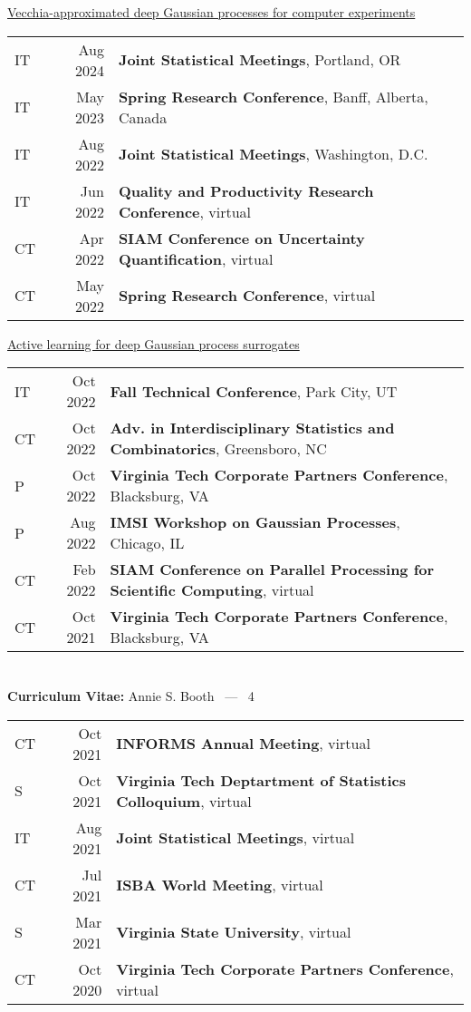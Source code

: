 \documentclass[margin,line,11pt]{res}
\begin{document}
\begin{resume}
\underline{Vecchia-approximated deep Gaussian processes for computer experiments}\\
\begin{tabular}{lrl}
IT & Aug 2024 & {\bf Joint Statistical Meetings}, Portland, OR \\
IT & May 2023 & {\bf Spring Research Conference}, Banff, Alberta, Canada \\
IT & Aug 2022 & {\bf Joint Statistical Meetings}, Washington, D.C. \\
IT & Jun 2022 & {\bf Quality and Productivity Research Conference}, virtual \\
CT & Apr 2022 & {\bf SIAM Conference on Uncertainty Quantification}, virtual \\
CT & May 2022 & {\bf Spring Research Conference}, virtual \\
\end{tabular}

\underline{Active learning for deep Gaussian process surrogates}\\
\begin{tabular}{lrl}
IT & Oct 2022 & {\bf Fall Technical Conference}, Park City, UT \\
CT & Oct 2022 & {\bf Adv. in Interdisciplinary Statistics and Combinatorics}, Greensboro, NC \\
P & Oct 2022 & {\bf Virginia Tech Corporate Partners Conference}, Blacksburg, VA \\
P & Aug 2022 & {\bf IMSI Workshop on Gaussian Processes}, Chicago, IL \\
CT & Feb 2022 & {\bf SIAM Conference on Parallel Processing for Scientific Computing}, virtual \\
CT & Oct 2021 & {\bf Virginia Tech Corporate Partners Conference}, Blacksburg, VA \\
\end{tabular}

\pagebreak
\section{}
\hfill {\bf Curriculum Vitae:} Annie S. Booth \  --- \  4
\medskip

\begin{tabular}{lrl}
CT & Oct 2021 & {\bf INFORMS Annual Meeting}, virtual \\
S & Oct 2021 & {\bf Virginia Tech Deptartment of Statistics Colloquium}, virtual \\
IT & Aug 2021 & {\bf Joint Statistical Meetings}, virtual \\
CT& Jul 2021 & {\bf ISBA World Meeting}, virtual \\
S & Mar 2021 & {\bf Virginia State University}, virtual \\
CT & Oct 2020 & {\bf Virginia Tech Corporate Partners Conference}, virtual \\
\end{tabular}


\end{resume}
\end{document}
